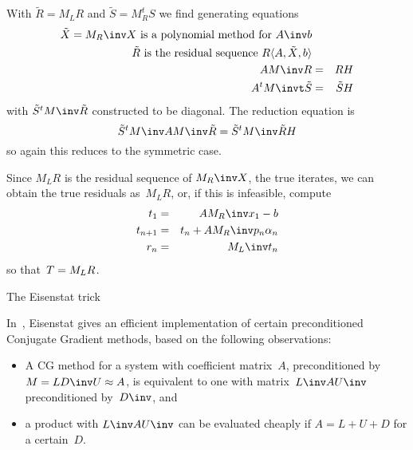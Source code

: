 \documentclass[11pt]{artikel3}
\begin{document}
\begin{Outline}
With $\tilde R=M_LR$ and $\tilde S=M_R^tS$ we find generating equations
\begin{eqnarray*}
    \hbox{$\tilde X=M_R\inv X$ is a polynomial method for $A\inv b$}\\
    \hbox{$\tilde R$ is the residual sequence $R\langle A,\tilde X,b\rangle$}\\
    AM\inv R&=&RH\\ A^tM\invt\tilde S&=&\tilde SH
    \end{eqnarray*}
with $\tilde S^tM\inv \tilde R$ constructed to be diagonal.
The reduction equation is 
\[ \tilde S^tM\inv AM\inv \tilde R=\tilde S^tM\inv \tilde RH \]
so again this reduces to the symmetric case.

Since $M_LR$ is the residual sequence of $M_R\inv X$, the true iterates,
we can obtain the true residuals as~$M_LR$, or, if this is infeasible,
compute
\begin{eqnarray*} t_1&=&AM_R\inv x_1-b\\ t_{n+1}&=&t_n+AM_R\inv p_n\alpha_n\\
    r_n&=&M_L\inv t_n\\ \end{eqnarray*}
so that~$T=\nobreak M_LR$.

 {The Eisenstat trick}

In~\cite{Ei:efficientimplementation}, Eisenstat gives an efficient
implementation of certain preconditioned Conjugate Gradient methods,
based on the following observations:
\begin{itemize}
\item A CG method for a system with coefficient matrix~$A$,
preconditioned by $M=LD\inv U\approx A$, is equivalent
to one with matrix~$L\inv AU\inv$ preconditioned by~$D\inv$, and
\item a product with $L\inv AU\inv$ can be evaluated cheaply
if $A=L+U+D$ for a certain~$D$.
\end{itemize}


\end{Outline}
\end{document}
